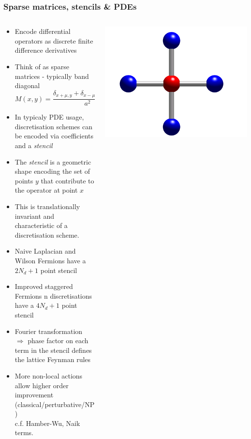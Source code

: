 \documentclass[pdf,ps,8pt]{beamer}
\begin{document}
\begin{frame}[fragile]\small\frametitle{ Sparse matrices, stencils \& PDEs}

  \begin{columns}
    \begin{column}{0.7\textwidth}
  \begin{itemize}
  \item Encode differential operators as discrete finite difference derivatives
  \item Think of as sparse matrices - typically band diagonal
  $$ M(x,y) = \frac{\delta_{x+\mu,y}+\delta_{x-\mu,y}-2\delta_{x,y}}{a^2} $$
  \item In typicaly PDE usage, discretisation schemes can be encoded via coefficients and a \emph{stencil}
  \item {\color{red}The \emph{stencil} is a geometric shape encoding the set of points $y$ that contribute to the operator at point $x$}
  \item This is translationally invariant and characteristic of a discretisation scheme.
  \item Naive Laplacian and Wilson Fermions have a $2 N_d + 1 $ point stencil
  \item Improved staggered Fermions n discretisations have a $4 N_d + 1 $ point stencil
  \item Fourier transformation $\Rightarrow$ phase factor on each term in the stencil defines the lattice Feynman rules
  \item More non-local actions allow higher order improvement \\
    (classical/perturbative/NP)\\
    c.f. Hamber-Wu, Naik terms.
  \end{itemize}
    \end{column}
    \begin{column}{0.3\textwidth}
      \includegraphics[width=\textwidth]{Stencil.pdf}


\end{column}
\end{columns}
\end{frame}
\end{document}
